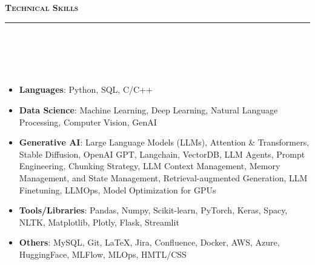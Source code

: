 \documentclass[a4paper,10pt]{article}
\newcommand{\lsep}{-0.5cm}
\newcommand{\resheading}[1]{{\small
        {
            \begin{minipage}
                {0.992\textwidth}\textbf{{\textsc{#1 \vphantom{p\^{E}} }}}
                \\[-0.3cm]
                \hrule
            \end{minipage}
            \\[-0.5cm]
        }
 }}
\begin{document}
\noindent
\resheading{\textbf{\large Technical Skills}}\\[\lsep] 
\\[-0.3cm]
\begin{itemize}
  \item \textbf{Languages}: Python, SQL, C/C++\\[-0.6cm]
  \item \textbf{Data Science}: Machine Learning, Deep Learning, Natural Language Processing, Computer Vision, GenAI  \\[-0.6cm]
  \item \textbf{Generative AI}: Large Language Models (LLMs), Attention \& Transformers, Stable Diffusion, OpenAI GPT, Langchain, VectorDB, LLM Agents, Prompt Engineering, Chunking Strategy, LLM Context Management, Memory Management, and State Management, Retrieval-augmented Generation, LLM Finetuning, LLMOps, Model Optimization for GPUs \\[-0.6cm]
  \item \textbf{Tools/Libraries}: Pandas, Numpy, Scikit-learn, PyTorch, Keras, Spacy, NLTK, Matplotlib, Plotly, Flask, Streamlit \\[-0.6cm]
  \item \textbf{Others}: MySQL, Git, LaTeX, Jira, Confluence, Docker, AWS, Azure, HuggingFace, MLFlow, MLOps, HMTL/CSS\\[-0.4cm]
\end{itemize}

\end{document}
